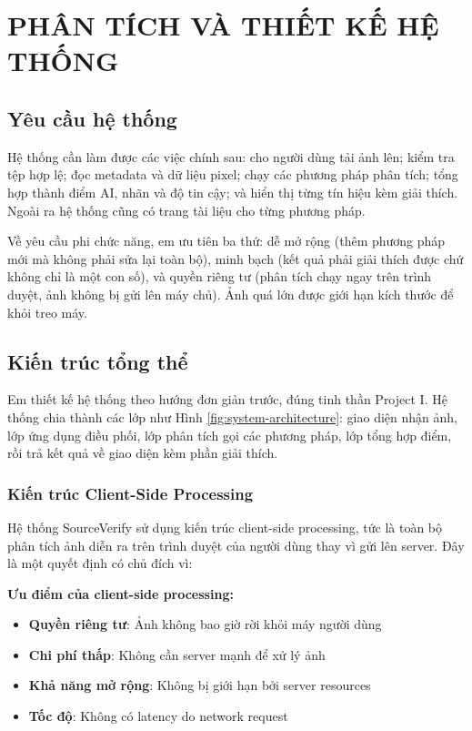 \chapter{PHÂN TÍCH VÀ THIẾT KẾ HỆ THỐNG}

\section{Yêu cầu hệ thống}
Hệ thống cần làm được các việc chính sau: cho người dùng tải ảnh lên; kiểm tra tệp hợp lệ; đọc metadata và dữ liệu pixel; chạy các phương pháp phân tích; tổng hợp thành điểm AI, nhãn và độ tin cậy; và hiển thị từng tín hiệu kèm giải thích. Ngoài ra hệ thống cũng có trang tài liệu cho từng phương pháp.

Về yêu cầu phi chức năng, em ưu tiên ba thứ: dễ mở rộng (thêm phương pháp mới mà không phải sửa lại toàn bộ), minh bạch (kết quả phải giải thích được chứ không chỉ là một con số), và quyền riêng tư (phân tích chạy ngay trên trình duyệt, ảnh không bị gửi lên máy chủ). Ảnh quá lớn được giới hạn kích thước để khỏi treo máy.

\section{Kiến trúc tổng thể}
Em thiết kế hệ thống theo hướng đơn giản trước, đúng tinh thần Project I. Hệ thống chia thành các lớp như Hình \ref{fig:system-architecture}: giao diện nhận ảnh, lớp ứng dụng điều phối, lớp phân tích gọi các phương pháp, lớp tổng hợp điểm, rồi trả kết quả về giao diện kèm phần giải thích.

\subsection{Kiến trúc Client-Side Processing}
Hệ thống SourceVerify sử dụng kiến trúc client-side processing, tức là toàn bộ phân tích ảnh diễn ra trên trình duyệt của người dùng thay vì gửi lên server. Đây là một quyết định có chủ đích vì:

\textbf{Ưu điểm của client-side processing:}
\begin{itemize}
  \item \textbf{Quyền riêng tư}: Ảnh không bao giờ rời khỏi máy người dùng
  \item \textbf{Chi phí thấp}: Không cần server mạnh để xử lý ảnh
  \item \textbf{Khả năng mở rộng}: Không bị giới hạn bởi server resources
  \item \textbf{Tốc độ}: Không có latency do network request
\end{itemize}

